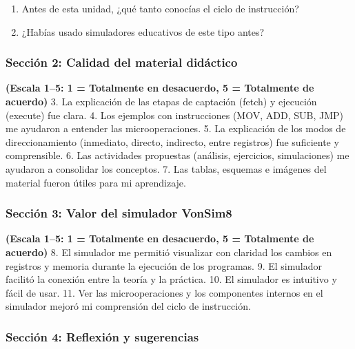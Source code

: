 \documentclass[12pt,oneside]{templates/unerthesis}
\providecommand{\tightlist}{%
  \setlength{\itemsep}{0pt}\setlength{\parskip}{0pt}}
\begin{document}
\begin{enumerate}
\def\labelenumi{\arabic{enumi}.}
\tightlist
\item
  Antes de esta unidad, ¿qué tanto conocías el ciclo de instrucción?
\item
  ¿Habías usado simuladores educativos de este tipo antes?
\end{enumerate}

\hypertarget{secciuxf3n-2-calidad-del-material-diduxe1ctico}{%
\subsubsection{Sección 2: Calidad del material didáctico}\label{secciuxf3n-2-calidad-del-material-diduxe1ctico}}

\textbf{(Escala 1--5: 1 = Totalmente en desacuerdo, 5 = Totalmente de acuerdo)}
3. La explicación de las etapas de captación (fetch) y ejecución (execute) fue clara.
4. Los ejemplos con instrucciones (MOV, ADD, SUB, JMP) me ayudaron a entender las microoperaciones.
5. La explicación de los modos de direccionamiento (inmediato, directo, indirecto, entre registros) fue suficiente y comprensible.
6. Las actividades propuestas (análisis, ejercicios, simulaciones) me ayudaron a consolidar los conceptos.
7. Las tablas, esquemas e imágenes del material fueron útiles para mi aprendizaje.

\hypertarget{secciuxf3n-3-valor-del-simulador-vonsim8}{%
\subsubsection{Sección 3: Valor del simulador VonSim8}\label{secciuxf3n-3-valor-del-simulador-vonsim8}}

\textbf{(Escala 1--5: 1 = Totalmente en desacuerdo, 5 = Totalmente de acuerdo)}
8. El simulador me permitió visualizar con claridad los cambios en registros y memoria durante la ejecución de los programas.
9. El simulador facilitó la conexión entre la teoría y la práctica.
10. El simulador es intuitivo y fácil de usar.
11. Ver las microoperaciones y los componentes internos en el simulador mejoró mi comprensión del ciclo de instrucción.

\hypertarget{secciuxf3n-4-reflexiuxf3n-y-sugerencias}{%
\subsubsection{Sección 4: Reflexión y sugerencias}\label{secciuxf3n-4-reflexiuxf3n-y-sugerencias}}
\end{document}
